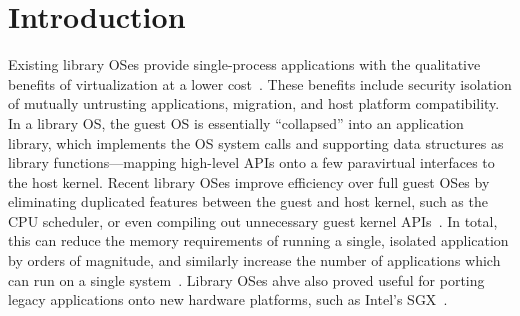 \section{Introduction}
\label{sec:intro}
Existing library OSes provide single-process applications
with the qualitative benefits of virtualization
at a lower cost~\citep{porter11drawbridge,unikernels,baumann13bascule}.
These benefits include security isolation of mutually untrusting applications,
migration, and host platform compatibility.
In a library OS, the guest OS is essentially ``collapsed''
into an application library,
which implements the OS system calls and supporting data structures as library functions---mapping
high-level APIs onto
a few paravirtual interfaces to the host kernel.
Recent library OSes improve efficiency over full guest OSes by eliminating duplicated features
between the guest and host kernel,
such as the CPU scheduler, or
even compiling out unnecessary guest kernel APIs~\citep{unikernels}.
In total, this can reduce the memory requirements of running a single, isolated application
by orders of magnitude, and similarly
increase the number of applications which can run
on a single system~\citep{porter11drawbridge,unikernels}.
Library OSes ahve also proved
useful for porting legacy applications
onto new hardware platforms, such as Intel's SGX~\citep{baumann14haven}.



